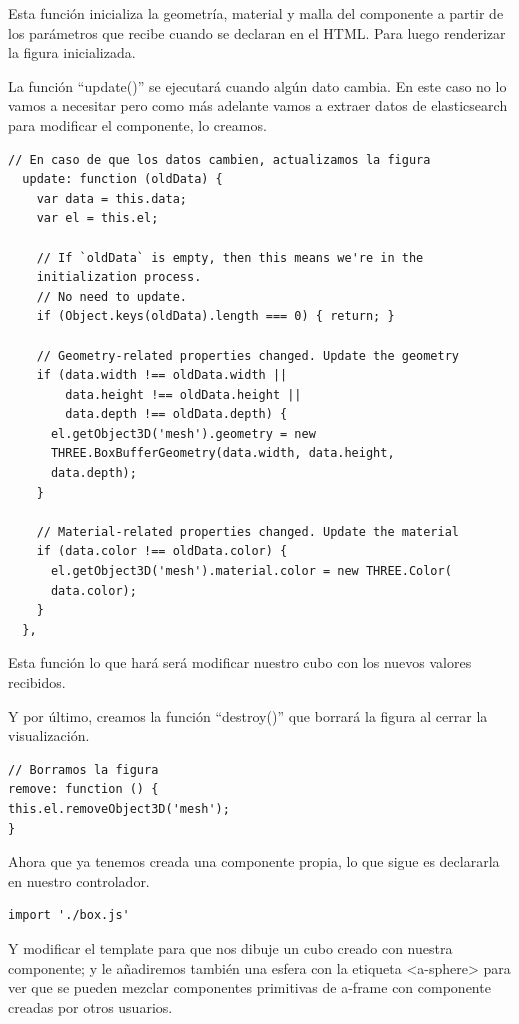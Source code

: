 \documentclass[a4paper, 12pt]{book}
\begin{document}
Esta función inicializa la geometría, material y malla del componente a partir de los parámetros que recibe cuando se declaran en el HTML. Para luego renderizar la figura inicializada.

La función “update()” se ejecutará cuando algún dato cambia. En este caso no lo vamos a necesitar pero como más adelante vamos a extraer datos de elasticsearch para modificar el componente, lo creamos.

\begin{lstlisting}[frame=single]
 // En caso de que los datos cambien, actualizamos la figura
  update: function (oldData) {
    var data = this.data;
    var el = this.el;

    // If `oldData` is empty, then this means we're in the 
    initialization process.
    // No need to update.
    if (Object.keys(oldData).length === 0) { return; }

    // Geometry-related properties changed. Update the geometry
    if (data.width !== oldData.width ||
        data.height !== oldData.height ||
        data.depth !== oldData.depth) {
      el.getObject3D('mesh').geometry = new 
      THREE.BoxBufferGeometry(data.width, data.height,
      data.depth);
    }

    // Material-related properties changed. Update the material
    if (data.color !== oldData.color) {
      el.getObject3D('mesh').material.color = new THREE.Color(
      data.color);
    }
  },
\end{lstlisting}

Esta función lo que hará será modificar nuestro cubo con los nuevos valores recibidos.

Y por último, creamos la función “destroy()” que borrará la figura al cerrar la visualización.

\begin{lstlisting}[frame=single]
// Borramos la figura
remove: function () {
this.el.removeObject3D('mesh');
}
\end{lstlisting}

Ahora que ya tenemos creada una componente propia, lo que sigue es declararla en nuestro controlador.

\begin{lstlisting}[frame=single]
import './box.js'
\end{lstlisting}

Y modificar el template para que nos dibuje un cubo creado con nuestra componente; y le añadiremos también una esfera con la etiqueta <a-sphere> para ver que se pueden mezclar componentes primitivas de a-frame con componente creadas por otros usuarios. 
\end{document}
